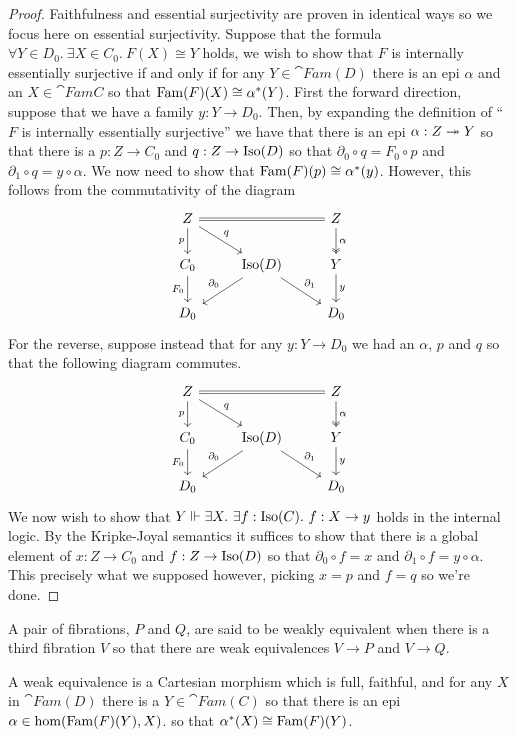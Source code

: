 \begin{proof}
  Faithfulness and essential surjectivity are proven in identical ways
  so we focus here on essential surjectivity. Suppose that the formula
  $\forall Y \in D_0.\ \exists X \in C_0.\ F(X) \cong Y$ holds, we
  wish to show that $F$ is internally essentially surjective if and
  only if for any $Y \in \cat{Fam}(D)$ there is an epi $\alpha$ and an
  $X \in \cat{Fam}{C}$ so that $\operatorname{Fam}(F)(X) \cong \alpha^*(Y)$.
  First the forward direction, suppose that we have a family
  $y : Y \to D_0$. Then, by expanding the definition of ``$F$ is
  internally essentially surjective'' we have that there is an epi
  $\alpha : Z \twoheadrightarrow Y$ so that there is a $p : Z \to C_0$ and
  $q : Z \to \operatorname{Iso}(D)$ so that $\partial_0 \circ q = F_0 \circ p$ and
  $\partial_1 \circ q = y \circ \alpha$. We now need to show that
  $\operatorname{Fam}(F)(p) \cong \alpha^*(y)$. However, this follows from the
  commutativity of the diagram
  \[
    \begin{tikzcd}
      Z \ar[rr, equals] \ar[d, swap, "p"] \ar[dr, "q"] && Z \ar[d, twoheadrightarrow, "\alpha"]\\
      C_0 \ar[d, swap, "F_0"] & \isos(D) \ar[dl, swap, "\partial_0"] \ar[dr, "\partial_1"] & Y \ar[d, "y"]\\
      D_0 && D_0
    \end{tikzcd}
  \]
  For the reverse, suppose instead that for any $y : Y \to D_0$ we had
  an $\alpha$, $p$ and $q$ so that the following diagram commutes.
  \[
    \begin{tikzcd}
      Z \ar[rr, equals] \ar[d, swap, "p"] \ar[dr, "q"] && Z \ar[d, twoheadrightarrow, "\alpha"]\\
      C_0 \ar[d, swap, "F_0"] & \isos(D) \ar[dl, swap, "\partial_0"] \ar[dr, "\partial_1"] & Y \ar[d, "y"]\\
      D_0 && D_0
    \end{tikzcd}
  \]
  We now wish to show that
  $Y \Vdash \exists X.\ \exists f : \operatorname{Iso}(C).\ f : X \to y$ holds in
  the internal logic. By the Kripke-Joyal semantics it suffices to
  show that there is a global element of $x : Z \to C_0$ and
  $f : Z \to \operatorname{Iso}(D)$ so that $\partial_0 \circ f = x$ and
  $\partial_1 \circ f = y \circ \alpha$. This precisely what we
  supposed however, picking $x = p$ and $f = q$ so we're done.
\end{proof}
\begin{defn}\label{defn:complete:weakequivalencefib}
  A pair of fibrations, $P$ and $Q$, are said to be weakly equivalent
  when there is a third fibration $V$ so that there are weak
  equivalences $V \to P$ and $V \to Q$.

  A weak equivalence is a Cartesian morphism which is full, faithful,
  and for any $X$ in $\cat{Fam}(D)$ there is a $Y \in \cat{Fam}(C)$ so
  that there is an epi $\alpha \in \hom(\operatorname{Fam}(F)(Y), X)$. so that
  $\alpha^*(X) \cong \operatorname{Fam}(F)(Y)$.
\end{defn}
